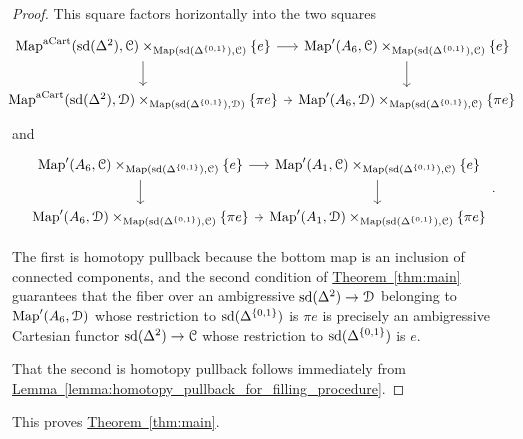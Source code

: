 \documentclass[main.tex]{subfiles}
\begin{document}
\begin{proof}
  This square factors horizontally into the two squares
  \begin{equation*}
    \noindent\makebox[\textwidth]{%
      \begin{tikzcd}[ampersand replacement=\&, column sep=tiny]
        \Fun^{\aCart}(\sd(\Delta^{2}), \category{C}) \times_{\Fun(\sd(\Delta^{\{0, 1\}}), \category{C})} \{e\}
        \arrow[r]
        \arrow[d]
        \& \Fun'(A_{6}, \category{C}) \times_{\Fun(\sd(\Delta^{\{0, 1\}}), \category{C})} \{e\}
        \arrow[d]
        \\
        \Fun^{\aCart}(\sd(\Delta^{2}), \category{D}) \times_{\Fun(\sd(\Delta^{\{0, 1\}}), \category{D})} \{\pi e\}
        \arrow[r]
        \& \Fun'(A_{6}, \category{D}) \times_{\Fun(\sd(\Delta^{\{0, 1\}}), \category{C})} \{\pi e\}
      \end{tikzcd}
    }
  \end{equation*}
  and
  \begin{equation*}
    \noindent\makebox[\textwidth]{%
      \begin{tikzcd}[ampersand replacement=\&, column sep=tiny]
        \Fun'(A_{6}, \category{C}) \times_{\Fun(\sd(\Delta^{\{0, 1\}}), \category{C})} \{e\}
        \arrow[r]
        \arrow[d]
        \& \Fun'(A_{1}, \category{C}) \times_{\Fun(\sd(\Delta^{\{0, 1\}}), \category{C})} \{e\}
        \arrow[d]
        \\
        \Fun'(A_{6}, \category{D}) \times_{\Fun(\sd(\Delta^{\{0, 1\}}), \category{C})} \{\pi e\}
        \arrow[r]
        \& \Fun'(A_{1}, \category{D}) \times_{\Fun(\sd(\Delta^{\{0, 1\}}), \category{C})} \{\pi e\}
      \end{tikzcd}.
    }
  \end{equation*}

  The first is homotopy pullback because the bottom map is an inclusion of connected components, and the second condition of \hyperref[thm:main]{Theorem~\ref*{thm:main}} guarantees that the fiber over an ambigressive $\mathrm{sd}(\Delta^{2}) \to \mathcal{D}$ belonging to $\mathrm{Map}'(A_{6}, \mathcal{D})$ whose restriction to $\mathrm{sd}(\Delta^{\{0, 1\}})$ is $\pi e$ is precisely an ambigressive Cartesian functor $\mathrm{sd}(\Delta^{2}) \to \mathcal{C}$ whose restriction to $\mathrm{sd}(\Delta^{\{0, 1\}})$ is $e$.

  That the second is homotopy pullback follows immediately from \hyperref[lemma:homotopy_pullback_for_filling_procedure]{Lemma~\ref*{lemma:homotopy_pullback_for_filling_procedure}}.
\end{proof}

This proves \hyperref[thm:main]{Theorem~\ref*{thm:main}}.
\end{document}

